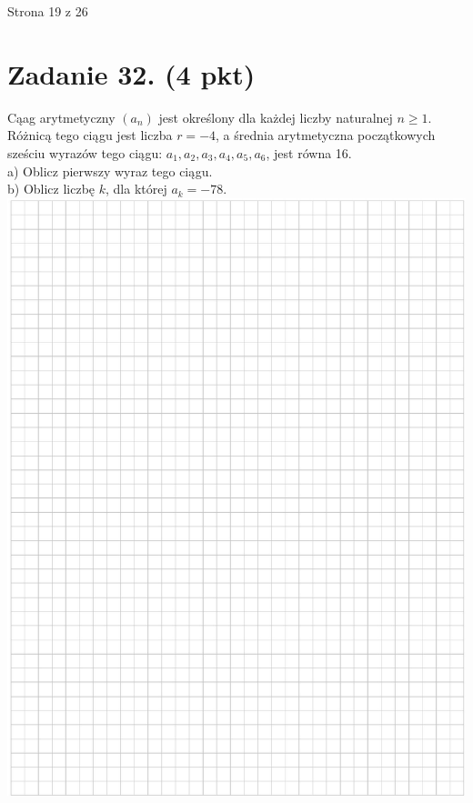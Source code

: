 \documentclass[10pt]{article}
\begin{document}
Strona 19 z 26

\section*{Zadanie 32. (4 pkt)}
Cąag arytmetyczny \(\left(a_{n}\right)\) jest określony dla każdej liczby naturalnej \(n \geq 1\). Różnicą tego ciągu jest liczba \(r=-4\), a średnia arytmetyczna początkowych sześciu wyrazów tego ciągu: \(a_{1}, a_{2}, a_{3}, a_{4}, a_{5}, a_{6}\), jest równa 16.\\
a) Oblicz pierwszy wyraz tego ciągu.\\
b) Oblicz liczbę \(k\), dla której \(a_{k}=-78\).\\
\includegraphics[max width=\textwidth, center]{2024_11_21_d51d653f4fe4a5bb0c33g-20}\\
\end{document}
